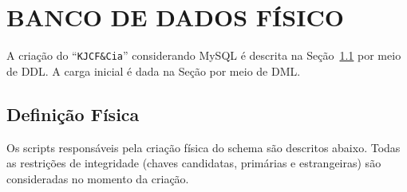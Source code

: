 \documentclass[
12pt,
a4paper,
semrecuonosumario,
sumario = abnt-6027-2012]{report}
\begin{document}
    \chapter{BANCO DE DADOS FÍSICO}\label{chap:fisico}
    A criação do ``\texttt{KJCF\&Cia}'' considerando MySQL é descrita na Seção~\ref{sec:def-fisica} por meio de DDL.
    A carga inicial é dada na Seção por meio de DML.

    \section{Definição Física}\label{sec:def-fisica}
    Os scripts responsáveis pela criação física do schema são descritos abaixo. Todas as restrições de integridade
    (chaves candidatas, primárias e estrangeiras) são consideradas no momento da criação.
\end{document}
